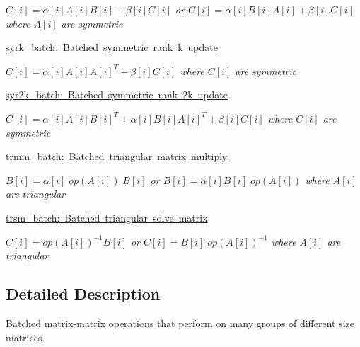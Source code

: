 \begin{DoxyCompactItemize}
\begin{DoxyCompactList}\small\item\em $ C[i] = \alpha[i] A[i] B[i] + \beta[i] C[i] $ or $ C[i] = \alpha[i] B[i] A[i] + \beta[i] C[i] $ where $ A[i] $ are symmetric \end{DoxyCompactList}\item 
\mbox{\hyperlink{group__syrk__batch}{syrk\+\_\+batch\+: Batched symmetric rank k update}}
\begin{DoxyCompactList}\small\item\em $ C[i] = \alpha[i] A[i] A[i]^T + \beta[i] C[i] $ where $ C[i] $ are symmetric \end{DoxyCompactList}\item 
\mbox{\hyperlink{group__syr2k__batch}{syr2k\+\_\+batch\+: Batched symmetric rank 2k update}}
\begin{DoxyCompactList}\small\item\em $ C[i] = \alpha[i] A[i] B[i]^T + \alpha[i] B[i] A[i]^T + \beta[i] C[i] $ where $ C[i] $ are symmetric \end{DoxyCompactList}\item 
\mbox{\hyperlink{group__trmm__batch}{trmm\+\_\+batch\+: Batched triangular matrix multiply}}
\begin{DoxyCompactList}\small\item\em $ B[i] = \alpha[i] \;op(A[i])\; B[i] $ or $ B[i] = \alpha[i] B[i] \;op(A[i]) $ where $ A[i] $ are triangular \end{DoxyCompactList}\item 
\mbox{\hyperlink{group__trsm__batch}{trsm\+\_\+batch\+: Batched triangular solve matrix}}
\begin{DoxyCompactList}\small\item\em $ C[i] = op(A[i])^{-1} B[i] $ or $ C[i] = B[i] \;op(A[i])^{-1} $ where $ A[i] $ are triangular \end{DoxyCompactList}\end{DoxyCompactItemize}


\subsection{Detailed Description}
Batched matrix-\/matrix operations that perform on many groups of different size matrices. 

